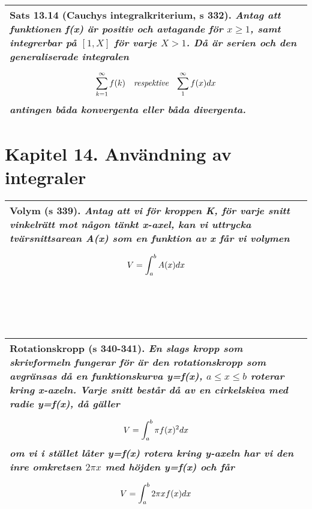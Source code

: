 \documentclass[a4paper]{article}
\begin{document}
\begin{tabular}{|L{11.5cm}|} \hline
\textbf{Sats 13.14} (Cauchys integralkriterium, s 332).
\textit{Antag att funktionen f(x) är positiv och avtagande för $x\geq 1$, samt integrerbar på $[1,X]$ för varje $X>1$. Då är serien och den generaliserade integralen}
\begin{equation*}
\begin{array}{>{\displaystyle}cc>{\displaystyle}c}
\sum_{k=1}^{\infty}f(k) & \textit{respektive} & \sum_{1}^{\infty}f(x)dx
\end{array}
\end{equation*}
\textit{antingen båda konvergenta eller båda divergenta.}
\\\hline
\end{tabular}
\section*{Kapitel 14. Användning av integraler}
\begin{tabular}{|L{11.5cm}|} \hline
\textbf{Volym} (s 339).
\textit{Antag att vi för kroppen K, för varje snitt vinkelrätt mot någon tänkt x-axel, kan vi uttrycka tvärsnittsarean A(x) som en funktion av x får vi volymen}
\begin{equation*}
\renewcommand{\arraystretch}{2.5}
\begin{array}{>{\displaystyle}c}
V = \int_{a}^{b}A(x)dx
\end{array}
\end{equation*}
\\\hline
\end{tabular}
\\\\\\
\begin{tabular}{|L{11.5cm}|} \hline
\textbf{Rotationskropp} (s 340-341).
\textit{En slags kropp som skrivformeln fungerar för är den \textbf{rotationskropp} som avgränsas då en funktionskurva y=f(x), $a\leq x \leq b$ roterar kring \textbf{x-axeln}. Varje snitt består då av en cirkelskiva med radie y=f(x), då gäller}
\begin{equation*}
\begin{array}{>{\displaystyle}c}
V = \int_{a}^{b}\pi f(x)^2dx
\end{array}
\end{equation*}
\textit{om vi i stället låter y=f(x) rotera kring \textbf{y-axeln} har vi den inre omkretsen $2\pi x$ med höjden y=f(x) och får}
\begin{equation*}
\begin{array}{>{\displaystyle}c}
V = \int_{a}^{b}2\pi x f(x)dx
\end{array}
\end{equation*}
\\\hline
\end{tabular}
\end{document}
